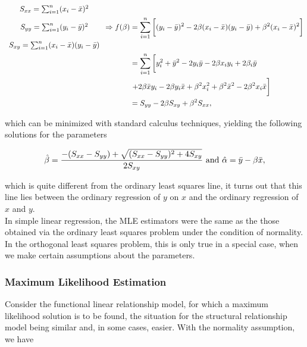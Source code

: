 \documentclass{homework}
\begin{document}
\begin{align*}
    \begin{array}{c}
       S_{xx} = \sum_{i=1}^{n} (x_i - \bar{x})^2  \\
       \\
       S_{yy} = \sum_{i=1}^{n} (y_i - \bar{y})^2   \\
       \\
       S_{xy} = \sum_{i=1}^{n} (x_i - \bar{x})(y_i - \bar{y})
    \end{array} \Rightarrow f(\beta) &= \sum_{i=1}^{n} \bigg[ (y_i - \bar{y})^2 - 2\beta (x_i - \bar{x}) (y_i - \bar{y}) + \beta^2 (x_i - \bar{x})^2 \bigg]\\
    &= \sum_{i=1}^{n} \bigg[ y_i^2 + \bar{y}^2 - 2y_i \bar{y} - 2\beta x_iy_i + 2\beta _i \bar{y} \\
    & \textnormal{      +} 2\beta \bar{x} y_i - 2 \beta y_i \bar{x} + \beta^2 x_i^2 + \beta^2 \bar{x}^2 - 2\beta^2 x_i \bar{x}\bigg] \\
    &= S_{yy} - 2\beta S_{xy} + \beta^2 S_{xx},
\end{align*}

which can be minimized with standard calculus techniques, yielding the following solutions for the parameters

\begin{equation}
    \hat{\beta} = \frac{-(S_{xx}-S_{yy}) + \sqrt{(S_{xx}-S_{yy})^2 + 4S_{xy}}}{2S_{xy}} \textnormal{ and } \hat{\alpha} = \bar{y} - \beta \bar{x},
\end{equation}

which is quite different from the ordinary least squares line, it turns out that this line lies between the ordinary regression of $y$ on $x$ and the ordinary regression of $x$ and $y$. \\

In simple linear regression, the MLE estimators were the same as the those obtained via the ordinary least squares problem under the condition of normality. In the orthogonal least squares problem, this is only true in a special case, when we make certain assumptions about the parameters. 

\subsubsection{Maximum Likelihood Estimation}

Consider the functional linear relationship model, for which a maximum likelihood solution is to be found, the situation for the structural relationship model being similar and, in some cases, easier. With the normality assumption, we have 
\end{document}
